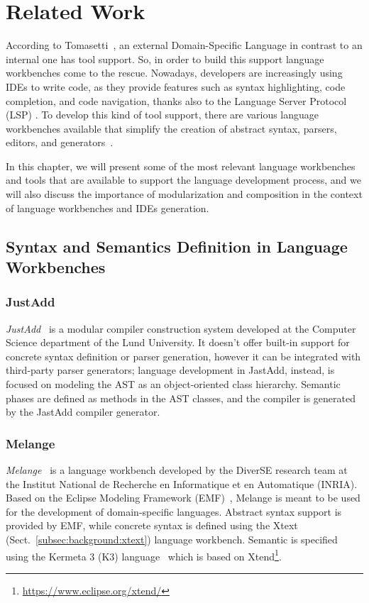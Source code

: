 \chapter{Related Work}\label{chap:RelatedWork}

According to Tomasetti~\cite{tomassetti_complete_2017}, an external Domain-Specific Language in contrast to an internal one has tool support. So, in order to build this support language workbenches come to the rescue.
Nowadays, developers are increasingly using IDEs to write code, as they provide features such as syntax highlighting, code completion, and code navigation, thanks also to the Language Server Protocol (LSP) \cite{Rodriguez-Echeverria18a}.
To develop this kind of tool support, there are various language workbenches available that simplify the creation of abstract syntax, parsers, editors, and generators~\cite{Fowler05}.

In this chapter, we will present some of the most relevant language workbenches and tools that are available to support the language development process, and we will also discuss the importance of modularization and composition in the context of language workbenches and IDEs generation.

\section{Syntax and Semantics Definition in Language Workbenches}\label{sec:background:syntax-semantics}

\subsection{JustAdd}\label{subsec:background:justadd}

\textit{JustAdd}~\cite{Ekman07b} is a modular compiler construction system developed at the Computer Science department of the Lund University.
It doesn’t offer built-in support for concrete syntax definition or parser generation, however it can be integrated with third-party parser generators; language development in JastAdd, instead, is focused on modeling the AST as an object-oriented class hierarchy. Semantic phases are defined as methods in the AST classes, and the compiler is generated by the JastAdd compiler generator.

\subsection{Melange}\label{subsec:background:melange}
\textit{Melange}~\cite{Degueule15}  is a language workbench developed by the DiverSE research team at the Institut National de Recherche en Informatique et en Automatique (INRIA). Based on the Eclipse Modeling Framework (EMF)~\cite{Steinberg08}, Melange is meant to be used for the development of domain-specific languages. Abstract syntax support is provided by EMF, while concrete syntax is defined using the Xtext (Sect.~\ref{subsec:background:xtext}) language workbench.
Semantic is specified using the Kermeta 3 (K3) language~\cite{Jezequel15} which is based on Xtend\footnote{\url{https://www.eclipse.org/xtend/}}.

